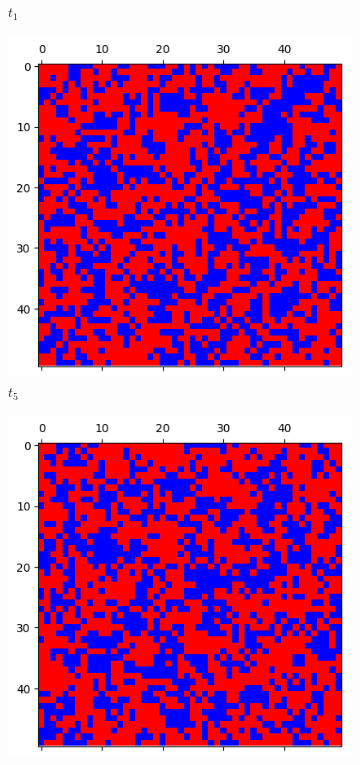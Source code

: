 \documentclass[letterpaper]{article}
\begin{document}
\begin{figure}[H]
\begin{subfigure}{.33\textwidth}
      \caption{$t_1$}
      \label{fig:t1_50part2}
    \end{subfigure}
    \begin{subfigure}{.33\textwidth}
      \centering
      \includegraphics[width=1\linewidth]{images/assign2/visu_50-part2/t5}
      \caption{$t_5$}
      \label{fig:t5_50part2}
    \end{subfigure}
    \begin{subfigure}{.33\textwidth}
      \centering
      \includegraphics[width=1\linewidth]{images/assign2/visu_50-part2/t10}

\end{subfigure}
\end{figure}
\end{document}
